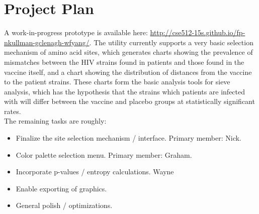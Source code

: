 \documentclass{article}
\begin{document}
\section{Project Plan}

A work-in-progress prototype is available here: \url{http://cse512-15s.github.io/fp-nkullman-gclenagh-wfyang/}.
The utility currently supports a very basic selection mechanism of amino acid sites, which generates charts showing the prevalence of mismatches between the HIV strains found in patients and those found in the vaccine itself, and a chart showing the distribution of distances from the vaccine to the patient strains. These charts form the basic analysis tools for sieve analysis, which has the hypothesis that the strains which patients are infected with will differ between the vaccine and placebo groups at statistically significant rates.\\

The remaining tasks are roughly:
\begin{itemize}
\item Finalize the site selection mechanism / interface.  Primary member: Nick.
\item Color palette selection menu.  Primary member: Graham.
\item Incorporate p-values / entropy calculations. Wayne
\item Enable exporting of graphics. 
\item General polish / optimizations. 
\end{itemize}



\end{document}
